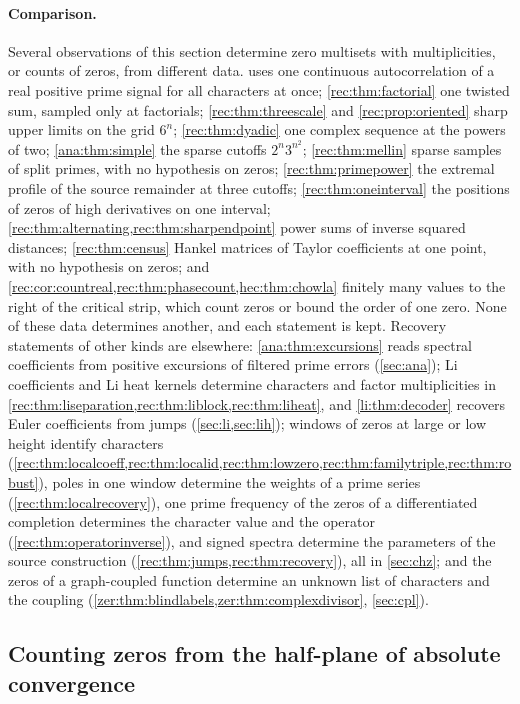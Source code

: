 \paragraph{Comparison.}
Several observations of this section determine zero multisets with multiplicities, or counts of
zeros, from different data.  uses one continuous autocorrelation of a real
positive prime signal for all characters at once;
\cref{rec:thm:factorial} one twisted sum, sampled only at factorials; \cref{rec:thm:threescale} and
\cref{rec:prop:oriented} sharp upper limits on the grid $6^n$; \cref{rec:thm:dyadic} one complex
sequence at the powers of two; \cref{ana:thm:simple} the sparse cutoffs $2^n3^{n^2}$;
\cref{rec:thm:mellin} sparse samples of split primes, with no hypothesis on zeros;
\cref{rec:thm:primepower} the extremal profile of the source remainder at three cutoffs;
\cref{rec:thm:oneinterval} the positions of zeros of high derivatives on one interval;
\cref{rec:thm:alternating,rec:thm:sharpendpoint} power sums of inverse squared distances;
\cref{rec:thm:census} Hankel matrices of Taylor coefficients at one point, with no hypothesis on
zeros; and \cref{rec:cor:countreal,rec:thm:phasecount,hec:thm:chowla} finitely many values to the right
of the critical strip, which count zeros or bound the order of one zero. None of these data
determines another, and each statement is kept. Recovery statements of other kinds are elsewhere:
\cref{ana:thm:excursions} reads spectral coefficients from positive excursions of filtered prime
errors (\cref{sec:ana}); Li coefficients and Li heat kernels determine characters and factor
multiplicities in \cref{rec:thm:liseparation,rec:thm:liblock,rec:thm:liheat}, and \cref{li:thm:decoder}
recovers Euler coefficients from jumps (\cref{sec:li,sec:lih}); windows of zeros at large or low height
identify characters (\cref{rec:thm:localcoeff,rec:thm:localid,rec:thm:lowzero,rec:thm:familytriple,rec:thm:robust}),
poles in one window determine the weights of a prime series (\cref{rec:thm:localrecovery}), one prime
frequency of the zeros of a differentiated completion determines the character value and the
operator (\cref{rec:thm:operatorinverse}), and
signed spectra determine the parameters of the source construction (\cref{rec:thm:jumps,rec:thm:recovery}),
all in \cref{sec:chz}; and the zeros of a graph-coupled function determine an unknown list of characters
and the coupling (\cref{zer:thm:blindlabels,zer:thm:complexdivisor}, \cref{sec:cpl}).

\subsection{Counting zeros from the half-plane of absolute convergence}\label{rec:sec:count}

